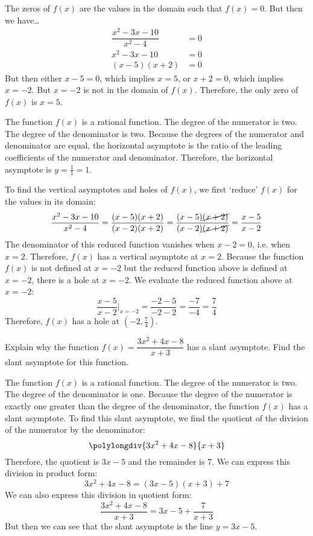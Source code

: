 \documentclass[12pt,letterpaper]{exam}
\begin{document}
\begin{questions}
The zeros of $f(x)$ are the values in the domain such that $f(x)= 0$. But then we have\dots
	\[
	\begin{aligned}
	\dfrac{x^2 - 3x - 10}{x^2 - 4}&= 0 \\[0.3cm]
	x^2 - 3x - 10&= 0 \\[0.3cm]
	(x - 5)(x + 2)&= 0
	\end{aligned}
	\]
But then either $x - 5= 0$, which implies $x= 5$, or $x + 2= 0$, which implies $x= -2$. But $x= -2$ is not in the domain of $f(x)$. Therefore, the only zero of $f(x)$ is $x= 5$. \pspace

The function $f(x)$ is a rational function. The degree of the numerator is two. The degree of the denominator is two. Because the degrees of the numerator and denominator are equal, the horizontal asymptote is the ratio of the leading coefficients of the numerator and denominator. Therefore, the horizontal asymptote is $y= \frac{1}{1}= 1$. \pspace

To find the vertical asymptotes and holes of $f(x)$, we first `reduce' $f(x)$ for the values in its domain:
	\[
	\dfrac{x^2 - 3x - 10}{x^2 - 4}= \dfrac{(x - 5)(x + 2)}{(x - 2)(x + 2)}= \dfrac{(x - 5)\cancel{(x + 2)}}{(x - 2)\cancel{(x + 2)}}= \dfrac{x - 5}{x - 2}
	\]
The denominator of this reduced function vanishes when $x - 2= 0$, i.e. when $x= 2$. Therefore, $f(x)$ has a vertical asymptote at $x= 2$. Because the function $f(x)$ is not defined at $x= -2$ but the reduced function above is defined at $x= -2$, there is a hole at $x= -2$. We evaluate the reduced function above at $x= -2$:
	\[
	\dfrac{x - 5}{x - 2} \bigg|_{x= -2}= \dfrac{-2 - 5}{-2 - 2}= \dfrac{-7}{-4}= \dfrac{7}{4}
	\]
Therefore, $f(x)$ has a hole at $\left(-2, \frac{7}{4} \right)$. 



\newpage
\question[10] Explain why the function $f(x)= \dfrac{3x^2 + 4x - 8}{x + 3}$ has a slant asymptote. Find the slant asymptote for this function. \pspace

\sol The function $f(x)$ is a rational function. The degree of the numerator is two. The degree of the denominator is one. Because the degree of the numerator is exactly one greater than the degree of the denominator, the function $f(x)$ has a slant asymptote. To find this slant asymptote, we find the quotient of the division of the numerator by the denominator: 
	\[
	\polylongdiv{3x^2 + 4x - 8}{x + 3}
	\]
Therefore, the quotient is $3x - 5$ and the remainder is $7$. We can express this division in product form:
	\[
	3x^2 + 4x - 8= (3x - 5)(x + 3) + 7
	\]
We can also express this division in quotient form:
	\[
	\dfrac{3x^2 + 4x - 8}{x + 3}= 3x - 5 + \dfrac{7}{x + 3}
	\]
But then we can see that the slant asymptote is the line $y= 3x - 5$.


\end{questions}
\end{document}
